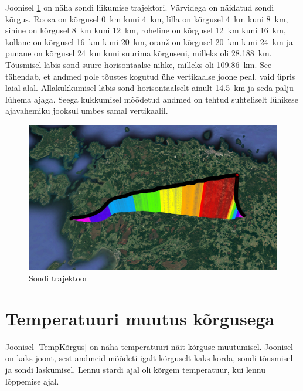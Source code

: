 \documentclass{trkut}%
\begin{document}
Joonisel \ref{trajektoor} on näha sondi liikumise trajektori. Värvidega on näidatud sondi kõrgus. Roosa on kõrgusel \SI{0}{km} kuni \SI{4}{km}, lilla on kõrgusel \SI{4}{km} kuni \SI{8}{km}, sinine on kõrgusel \SI{8}{km} kuni \SI{12}{km}, roheline on kõrgusel \SI{12}{km} kuni \SI{16}{km}, kollane on kõrgusel \SI{16}{km} kuni \SI{20}{km}, oranž on kõrgusel \SI{20}{km} kuni \SI{24}{km} ja punane on kõrgusel \SI{24}{km} kuni suurima kõrguseni, milleks oli \SI{28.188}{km}. Tõusmisel läbis sond suure horisontaalse nihke, milleks oli \SI{109.86}{km}. See tähendab, et andmed pole tõustes kogutud ühe vertikaalse joone peal, vaid üpris laial alal. Allakukkumisel läbis sond horisontaalselt ainult \SI{14.5}{km} ja seda palju lühema ajaga. Seega kukkumisel mõõdetud andmed on tehtud suhteliselt lühikese ajavahemiku jooksul umbes samal vertikaalil.
\begin{figure}[h]
	\includegraphics[width=1\textwidth]{PicGra/teekond.jpg}
	\caption{Sondi trajektoor}
	\label{trajektoor}%
\end{figure}

\section{Temperatuuri muutus kõrgusega}
Joonisel \ref{TempKõrgus} on näha temperatuuri näit kõrguse muutumisel. Joonisel on kaks joont, sest andmeid mõõdeti igalt kõrguselt kaks korda, sondi tõusmisel ja sondi laskumisel. Lennu stardi ajal oli kõrgem temperatuur, kui lennu lõppemise ajal.
\end{document}
